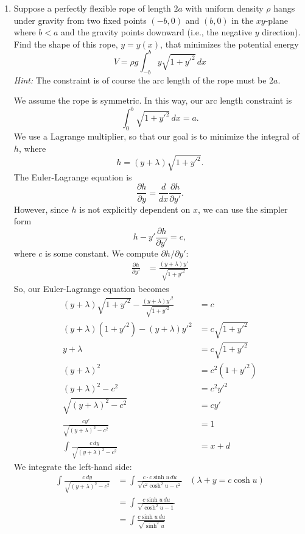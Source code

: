 \documentclass[10pt,letterpaper]{report}
\newcommand{\pp}[2]{\frac{\partial{#1}}{\partial{#2}}}
\begin{document}
\begin{enumerate}
\item \begin{qbox}
Suppose a perfectly flexible rope of length $2a$ with uniform density $\rho$ hangs under gravity from two fixed points $(-b, 0)$ and $(b, 0)$ in the $x y$-plane where $b < a$ and the gravity points downward (i.e., the negative $y$ direction). Find the shape of this rope, $y = y(x)$, that
minimizes the potential energy
\[
V = \rho g \int_{-b}^b y \sqrt{ 1 + y'^2}\,dx
\]
\textit{Hint:} The constraint is of course the arc length of the rope must be $2a$.
\end{qbox}
We assume the rope is symmetric. In this way, our arc length constraint is
\[
\int_0^b \sqrt{1 + y'^2}\,dx = a.
\]
We use a Lagrange multiplier, so that our goal is to minimize the integral of $h$, where
\[
h = (y + \lambda)\sqrt{1 + y'^2}.
\]
The Euler-Lagrange equation is
\[
\pp{h}{y} = \frac{d}{dx}\pp{h}{y'}.
\]
However, since $h$ is not explicitly dependent on $x$, we can use the simpler form
\[
h - y'\pp{h}{y'} = c,
\]
where $c$ is some constant. We compute $\partial h/\partial y':$
\begin{align*}
    \pp{h}{y'} &= \frac{(y + \lambda)y'}{\sqrt{1 + y'^2}}
\end{align*}
So, our Euler-Lagrange equation becomes
\begin{align*}
    (y + \lambda)\sqrt{1 + y'^2} - \frac{(y + \lambda)y'^2}{\sqrt{1 + y'^2}} &= c
    \\
    (y + \lambda)(1 + y'^2) - (y + \lambda)y'^2 &= c\sqrt{1 + y'^2}
    \\
    y + \lambda &= c\sqrt{1 + y'^2}
    \\
    (y + \lambda)^2 &= c^2(1 + y'^2)
    \\
    (y + \lambda)^2 - c^2 &= c^2y'^2
    \\
    \sqrt{(y + \lambda)^2 - c^2} &= cy'
    \\
    \frac{cy'}{\sqrt{(y + \lambda)^2 - c^2}} &= 1
    \\
    \int \frac{c\,dy}{\sqrt{(y + \lambda)^2 - c^2}} &= x + d
\end{align*}
We integrate the left-hand side:
\begin{align*}
    \int \frac{c\,dy}{\sqrt{(y + \lambda)^2 - c^2}}
    &=
    \int \frac{c\cdot c \sinh u\,du}{\sqrt{c^2\cosh^2 u - c^2}} &\left(\lambda + y = c\cosh u\right)
    \\
    &=
    \int \frac{c\sinh u\,du}{\sqrt{\cosh^2 u - 1}}
    \\
    &=
    \int \frac{c\sinh u\,du}{\sqrt{\sinh^2 u}}

\end{align*}
\end{enumerate}
\end{document}
